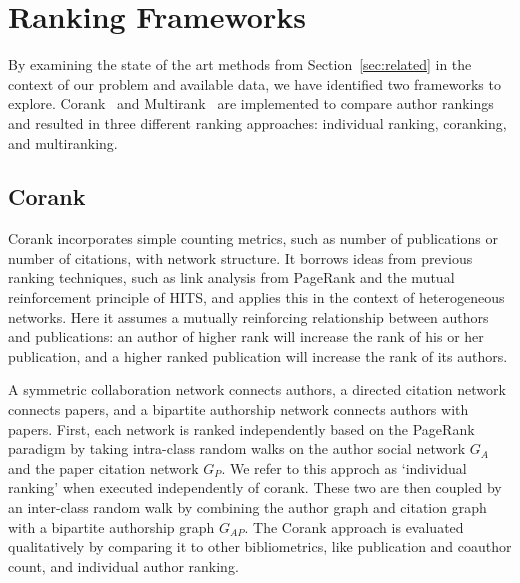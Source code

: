 \section{Ranking Frameworks}
By examining the state of the art methods from Section~\ref{sec:related} in the context of our problem and available data, we have identified two frameworks to explore. Corank~\cite{zhou2007co} and Multirank~\cite{ng2011multirank} are implemented to compare author rankings and resulted in three different ranking approaches: individual ranking, coranking, and multiranking. 

\subsection{Corank} 
Corank incorporates simple counting metrics, such as number of publications or number of citations, with network structure. It borrows ideas from previous ranking techniques, such as link analysis from PageRank and the mutual reinforcement principle of HITS, and applies this in the context of heterogeneous networks. Here it assumes a mutually reinforcing relationship between authors and publications: an author of higher rank will increase the rank of his or her publication, and a higher ranked publication will increase the rank of its authors. 

A symmetric collaboration network connects authors, a directed citation network connects papers, and a bipartite authorship network connects authors with papers. First, each network is ranked independently based on the PageRank paradigm by taking intra-class random walks on the author social network $G_A$ and the paper citation network $G_P$. We refer to this approch as `individual ranking' when executed independently of corank. These two are then coupled by an inter-class random walk by combining the author graph and citation graph with a bipartite authorship graph $G_{AP}$. The Corank approach is evaluated qualitatively by comparing it to other bibliometrics, like publication and coauthor count, and individual author ranking.


